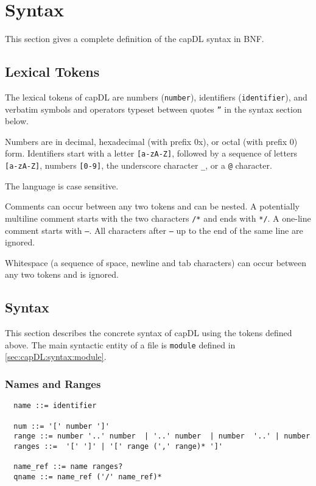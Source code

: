 \documentclass[a4paper,12pt]{article}
\begin{document}
\section{Syntax}
\label{sec:capDL:syntax}

This section gives a complete definition of the capDL syntax in BNF.

\subsection{Lexical Tokens}

The lexical tokens of capDL are numbers (\texttt{number}), identifiers
(\texttt{identifier}), and verbatim symbols and operators typeset between
quotes \texttt{''} in the syntax section below.

Numbers are in decimal, hexadecimal (with prefix 0x), or octal (with prefix 0)
form. Identifiers start with a letter \texttt{[a-zA-Z]}, followed by a
sequence of letters \texttt{[a-zA-Z]}, numbers \texttt{[0-9]}, the
underscore character \texttt{\_}, or a \texttt{@} character.

The language is case sensitive.

Comments can occur between any two tokens and can be nested. A potentially
multiline comment starts with the two characters \texttt{/*} and ends with
\texttt{*/}. A one-line comment starts with \texttt{--}. All characters after
\texttt{--} up to the end of the same line are ignored.

Whitespace (a sequence of space, newline and tab characters) can occur between
any two tokens and is ignored.


\subsection{Syntax}

This section describes the concrete syntax of capDL using the tokens defined above. The main syntactic entity of a file is \texttt{module} defined in \ref{sec:capDL:syntax:module}.

\subsubsection{Names and Ranges}

\begin{verbatim}
  name ::= identifier

  num ::= '[' number ']'
  range ::= number '..' number  | '..' number  | number  '..' | number            
  ranges ::=  '[' ']' | '[' range (',' range)* ']' 

  name_ref ::= name ranges?
  qname ::= name_ref ('/' name_ref)* 
\end{verbatim}
\end{document}
